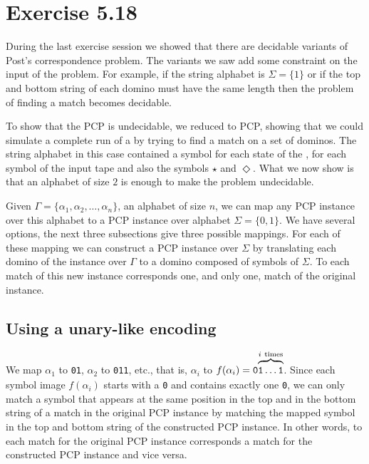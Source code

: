 \section{Exercise 5.18}
During the last exercise session we showed that there are decidable variants
of Post's correspondence problem. The variants we saw add some constraint on
the input of the problem. For example, if the string alphabet is \(\Sigma =
\{1\}\) or if the top and bottom string of each domino must have the same
length then the problem of finding a match becomes decidable.

To show that the PCP is undecidable, we reduced \Atm{} to PCP, showing that we
could simulate a complete run of a \TM{} by trying to find a match on a
set of dominos. The string alphabet in this case contained a symbol for each
state of the \TM{}, for each symbol of the input tape and also the symbols
\texttt{\(\star\)} and \texttt{\(\Diamond\)}.
What we now show is that an alphabet of size \(2\) is enough to make
the problem undecidable.

Given \(\Gamma = \{\alpha_1, \alpha_2, \ldots, \alpha_n\}\), an alphabet of size \(n\),
we can map any PCP instance over this alphabet to a PCP instance over alphabet
\(\Sigma = \{0,1\}\). We have several options, the next three subsections give
three possible mappings. For each of these mapping we can construct a PCP
instance over \(\Sigma\)
by translating each domino of the instance over \(\Gamma\) to a domino composed
of symbols of \(\Sigma\). To each match of this new instance corresponds one,
and only one, match of the original instance.

\subsection{Using a unary-like encoding}
We map \(\alpha_1\) to \texttt{01}, \(\alpha_2\) to \texttt{011}, etc., that
is, \(\alpha_i\) to
\(f(\alpha_i) =
\texttt{0}\mathrlap{\overbrace{\phantom{\texttt{1}\ldots
\texttt{1}\strut}}^{i~\text{times}}}\texttt{1}\ldots\texttt{1}\).
Since each symbol image \(f(\alpha_i)\) starts with a \texttt{0} and
contains exactly one \texttt{0},
we can only match a symbol that appears at the same position in the top
and in the bottom string of a match in the original PCP instance by matching
the mapped symbol in the top and bottom string of the constructed PCP instance.
In other words, to each match for the original PCP instance corresponds a match
for the constructed PCP instance and vice versa.

